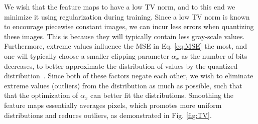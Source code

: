 \documentclass[reqno]{amsart}
\begin{document}
We wish that the feature maps to have a low TV norm, and to this end we minimize it using regularization during training. Since a low TV norm is known to encourage piecewise constant images, we can incur less errors when quantizing these images. This is because they will typically contain less gray-scale values. Furthermore, extreme values influence the MSE in Eq. \eqref{eq:MSE} the most, and one will typically choose a smaller clipping parameter $\alpha_x$ as the number of bits decreases, to better approximate the distribution of values by the quantized distribution~\cite{soudry1}. Since both of these factors negate each other, we wish to eliminate extreme values (outliers) from the distribution as much as possible, such that that the optimization of $\alpha_x$ can better fit the distributions. Smoothing the feature maps essentially averages pixels, which promotes more uniform distributions and reduces outliers, as demonstrated in Fig. \ref{fig:TV}. 
\end{document}
